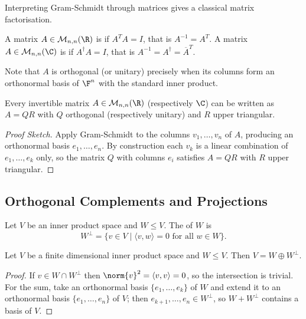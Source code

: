 Interpreting Gram-Schmidt through matrices gives a classical matrix factorisation.

\begin{definition}
    A matrix $A \in \mathcal{M}_{n,n}(\R)$ is  if $A^TA = I$, that is $A^{-1} = A^T$. A matrix $A \in \mathcal{M}_{n,n}(\C)$ is  if $A^\dagger A = I$, that is $A^{-1} = A^\dagger = \overline{A}^T$.
\end{definition}

Note that $A$ is orthogonal (or unitary) precisely when its columns form an orthonormal basis of $\F^n$ with the standard inner product.

\begin{proposition}[QR Decomposition]
    Every invertible matrix $A \in \mathcal{M}_{n,n}(\R)$ (respectively $\C$) can be written as $A = QR$ with $Q$ orthogonal (respectively unitary) and $R$ upper triangular.
\end{proposition}
\begin{proof}[Proof Sketch]
    Apply Gram-Schmidt to the columns $v_1, \dots, v_n$ of $A$, producing an orthonormal basis $e_1, \dots, e_n$. By construction each $v_k$ is a linear combination of $e_1, \dots, e_k$ only, so the matrix $Q$ with columns $e_i$ satisfies $A = QR$ with $R$ upper triangular.
\end{proof}

\subsection{Orthogonal Complements and Projections}

\begin{definition}
    Let $V$ be an inner product space and $W \leq V$. The  of $W$ is
    $$
    W^\perp = \{ v \in V \mid \langle v, w \rangle = 0 \text{ for all } w \in W\}.
    $$
\end{definition}

\begin{lemma}
    Let $V$ be a finite dimensional inner product space and $W \leq V$. Then $V = W \oplus W^\perp$.
\end{lemma}
\begin{proof}
    If $v \in W \cap W^\perp$ then $\norm{v}^2 = \langle v, v \rangle = 0$, so the intersection is trivial. For the sum, take an orthonormal basis $\{e_1, \dots, e_k\}$ of $W$ and extend it to an orthonormal basis $\{e_1, \dots, e_n\}$ of $V$; then $e_{k + 1}, \dots, e_n \in W^\perp$, so $W + W^\perp$ contains a basis of $V$.
\end{proof}


